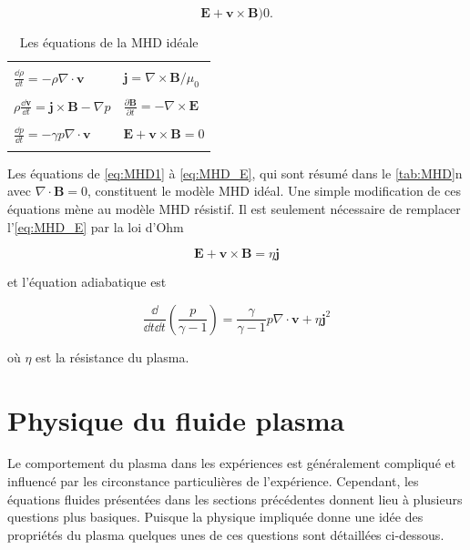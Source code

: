 \documentclass[main.tex]{subfiles}
\begin{document}
\begin{equation}
	\bm{E} + \bm{v} \times \bm{B} ) 0.
	\label{eq:MHD_E}
\end{equation}

\begin{table}
	\centering
	\caption{Les équations de la MHD idéale}
	\begin{tabular}{l l}
	\hline\\
	\( \frac{\dd \rho}{\dd t} = - \rho \nabla \cdot \bm{v} \) & \( \bm{j} = \nabla \times \bm{B} / \mu_0 \)\\\\
	\( \rho \frac{\dd \bm{v}}{\dd t} = \bm{j} \times \bm{B} - \nabla p \) & \( \frac{\partial \bm{B}}{\partial t} = - \nabla \times \bm{E} \)\\\\
	\( \frac{\dd p}{\dd t} = - \gamma p \nabla \cdot \bm{v} \) & \( \bm{E} + \bm{v} \times \bm{B} = 0 \)\\\\
	\hline
	\end{tabular}
	\label{tab:MHD}
\end{table}

Les équations de \ref{eq:MHD1} à \ref{eq:MHD_E}, qui sont résumé dans le \autoref{tab:MHD}n avec \( \nabla \cdot \bm{B} = 0 \), constituent le modèle MHD idéal.
Une simple modification de ces équations mène au modèle MHD résistif.
Il est seulement nécessaire de remplacer l'\autoref{eq:MHD_E} par la loi d'Ohm

\begin{equation}
	\bm{E} + \bm{v} \times \bm{B} = \eta \bm{j}
	\label{eq:MHD_ohm}
\end{equation}

\noindent et l'équation adiabatique est

\[
	\frac{\dd}{\dd t\dd t} \left( \frac{p}{\gamma - 1}\right) = \frac{\gamma }{\gamma - 1} p \nabla \cdot \bm{v} + \eta \bm{j}^2
\]

\noindent où \( \eta \) est la résistance du plasma.

\FloatBarrier
\section{Physique du fluide plasma}
\label{sec:physique_fluide_plasma}

Le comportement du plasma dans les expériences est généralement compliqué et influencé par les circonstance particulières de l'expérience.
Cependant, les équations fluides présentées dans les sections précédentes donnent lieu à plusieurs questions plus basiques.
Puisque la physique impliquée donne une idée des propriétés du plasma quelques unes de ces questions sont détaillées ci-dessous.
\end{document}
